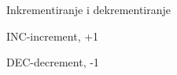 
\begin{frame}[label=05-s033]{Inkrementiranje i dekrementiranje}
\fontsize{10}{12}\selectfont\renewcommand{\arraystretch}{1.25}\setlength{\tabcolsep}{9pt}

INC-increment, +1
\begin{center}\end{center}\vspace{1mm}
DEC-decrement, -1
\begin{center}\end{center}
\end{frame}
